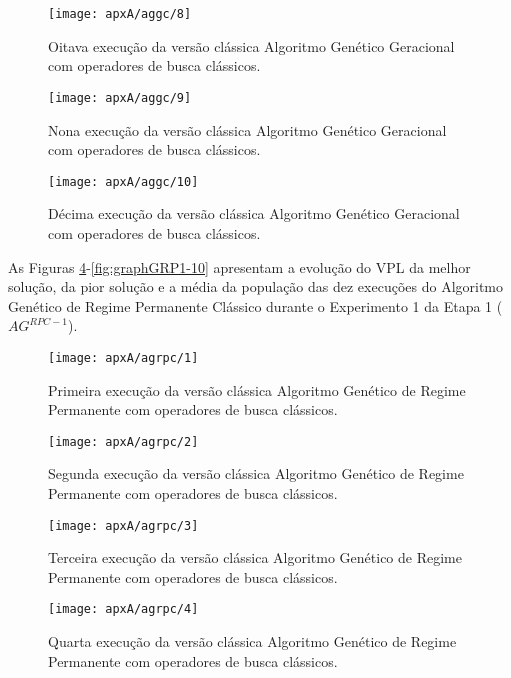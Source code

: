 \begin{figure}[H]
\centering
\texttt{[image: apxA/aggc/8]}
\caption{Oitava execução da versão clássica Algoritmo Genético Geracional com operadores de busca clássicos.}
\label{fig:graphGC1-08}
\end{figure}

\begin{figure}[H]
\centering
\texttt{[image: apxA/aggc/9]}
\caption{Nona execução da versão clássica Algoritmo Genético Geracional com operadores de busca clássicos.}
\label{fig:graphGC1-09}
\end{figure}

\begin{figure}[H]
\centering
\texttt{[image: apxA/aggc/10]}
\caption{Décima execução da versão clássica Algoritmo Genético Geracional com operadores de busca clássicos.}
\label{fig:graphGC1-10}
\end{figure}

As Figuras \ref{fig:graphGRP1-01}-\ref{fig:graphGRP1-10} apresentam a evolução do VPL da melhor solução, da pior solução e a média da população das dez execuções do Algoritmo Genético de Regime Permanente Clássico durante o Experimento 1 da Etapa 1 ($AG^{RPC-1}$).

\begin{figure}[H]
\centering
\texttt{[image: apxA/agrpc/1]}
\caption{Primeira execução da versão clássica Algoritmo Genético de Regime Permanente com operadores de busca clássicos.}
\label{fig:graphGRP1-01}
\end{figure}

\begin{figure}[H]
\centering
\texttt{[image: apxA/agrpc/2]}
\caption{Segunda execução da versão clássica Algoritmo Genético de Regime Permanente com operadores de busca clássicos.}
\label{fig:graphGRP1-02}
\end{figure}

\begin{figure}[H]
\centering
\texttt{[image: apxA/agrpc/3]}
\caption{Terceira execução da versão clássica Algoritmo Genético de Regime Permanente com operadores de busca clássicos.}
\label{fig:graphGRP1-03}
\end{figure}

\begin{figure}[H]
\centering
\texttt{[image: apxA/agrpc/4]}
\caption{Quarta execução da versão clássica Algoritmo Genético de Regime Permanente com operadores de busca clássicos.}
\label{fig:graphGRP1-04}
\end{figure}

